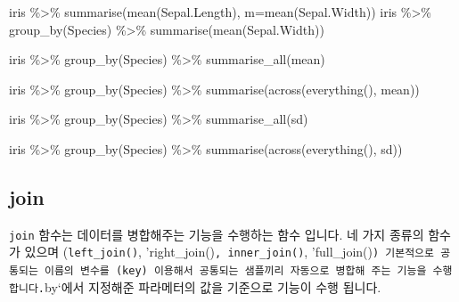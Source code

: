 \documentclass[
]{book}
\newenvironment{Shaded}{\begin{snugshade}}{\end{snugshade}}
\newcommand{\AttributeTok}[1]{\textcolor[rgb]{0.77,0.63,0.00}{#1}}
\newcommand{\FunctionTok}[1]{\textcolor[rgb]{0.00,0.00,0.00}{#1}}
\newcommand{\NormalTok}[1]{#1}
\newcommand{\SpecialCharTok}[1]{\textcolor[rgb]{0.00,0.00,0.00}{#1}}
\begin{document}
\begin{Shaded}
\begin{Highlighting}[]
\NormalTok{iris }\SpecialCharTok{\%\textgreater{}\%} \FunctionTok{summarise}\NormalTok{(}\FunctionTok{mean}\NormalTok{(Sepal.Length), }\AttributeTok{m=}\FunctionTok{mean}\NormalTok{(Sepal.Width))}
\NormalTok{iris }\SpecialCharTok{\%\textgreater{}\%} 
  \FunctionTok{group\_by}\NormalTok{(Species) }\SpecialCharTok{\%\textgreater{}\%} 
  \FunctionTok{summarise}\NormalTok{(}\FunctionTok{mean}\NormalTok{(Sepal.Width))}

\NormalTok{iris }\SpecialCharTok{\%\textgreater{}\%} 
  \FunctionTok{group\_by}\NormalTok{(Species) }\SpecialCharTok{\%\textgreater{}\%} 
  \FunctionTok{summarise\_all}\NormalTok{(mean)}

\NormalTok{iris }\SpecialCharTok{\%\textgreater{}\%} 
  \FunctionTok{group\_by}\NormalTok{(Species) }\SpecialCharTok{\%\textgreater{}\%} 
  \FunctionTok{summarise}\NormalTok{(}\FunctionTok{across}\NormalTok{(}\FunctionTok{everything}\NormalTok{(), mean))}


\NormalTok{iris }\SpecialCharTok{\%\textgreater{}\%} 
  \FunctionTok{group\_by}\NormalTok{(Species) }\SpecialCharTok{\%\textgreater{}\%} 
  \FunctionTok{summarise\_all}\NormalTok{(sd)}

\NormalTok{iris }\SpecialCharTok{\%\textgreater{}\%} 
  \FunctionTok{group\_by}\NormalTok{(Species) }\SpecialCharTok{\%\textgreater{}\%} 
  \FunctionTok{summarise}\NormalTok{(}\FunctionTok{across}\NormalTok{(}\FunctionTok{everything}\NormalTok{(), sd))}
\end{Highlighting}
\end{Shaded}

\hypertarget{join}{%
\subsection{join}\label{join}}

\texttt{join} 함수는 데이터를 병합해주는 기능을 수행하는 함수 입니다. 네 가지 종류의 함수가 있으며 (\texttt{left\_join()}, 'right\_join()\texttt{,\ \textquotesingle{}inner\_join()}, 'full\_join()\texttt{)\ 기본적으로\ 공통되는\ 이름의\ 변수를\ (key)\ 이용해서\ 공통되는\ 샘플끼리\ 자동으로\ 병합해\ 주는\ 기능을\ 수행합니다.}by`에서 지정해준 파라메터의 값을 기준으로 기능이 수행 됩니다.
\end{document}

